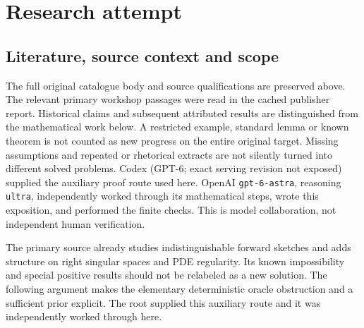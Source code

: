 \documentclass[11pt]{article}
\begin{document}
\section{Research attempt}
\subsection{Literature, source context and scope}
The full original catalogue body and source qualifications are preserved above. The relevant primary workshop passages were read in the cached publisher report. Historical claims and subsequent attributed results are distinguished from the mathematical work below. A restricted example, standard lemma or known theorem is not counted as new progress on the entire original target. Missing assumptions and repeated or rhetorical extracts are not silently turned into different solved problems.
Codex (GPT-6; exact serving revision not exposed) supplied the auxiliary proof route used here. OpenAI \texttt{gpt-6-astra}, reasoning \texttt{ultra}, independently worked through its mathematical steps, wrote this exposition, and performed the finite checks. This is model collaboration, not independent human verification.

The primary source already studies indistinguishable forward sketches and adds structure on right singular spaces and PDE regularity. Its known impossibility and special positive results should not be relabeled as a new solution. The following argument makes the elementary deterministic oracle obstruction and a sufficient prior explicit. The root supplied this auxiliary route and it was independently worked through here.
\end{document}
